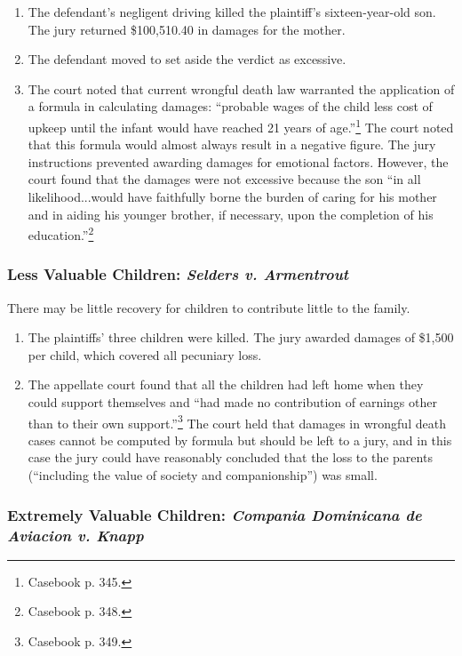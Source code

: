 \begin{enumerate}
    \item The defendant's negligent driving killed the plaintiff's 
    sixteen-year-old son. The jury returned \$100,510.40 in damages for the 
    mother.
    \item The defendant moved to set aside the verdict as excessive.
    \item The court noted that current wrongful death law warranted the 
    application of a formula in calculating damages: ``probable wages of the 
    child less cost of upkeep until the infant would have reached 21 years of 
    age.''\footnote{Casebook p. 345.} The court noted that this formula would 
    almost always result in a negative figure. The jury instructions prevented 
    awarding damages for emotional factors. However, the court found that the 
    damages were not excessive because the son ``in all likelihood...would 
    have faithfully borne the burden of caring for his mother and in aiding 
    his younger brother, if necessary, upon the completion of his 
    education.''\footnote{Casebook p. 348.}
\end{enumerate}

\subsubsection{Less Valuable Children: \emph{Selders v. Armentrout}}

There may be little recovery for children to contribute little to the family.

\begin{enumerate}
    \item The plaintiffs' three children were killed. The jury awarded damages 
    of \$1,500 per child, which covered all pecuniary loss.
    \item The appellate court found that all the children had left home when 
    they could support themselves and ``had made no contribution of earnings 
    other than to their own support.''\footnote{Casebook p. 349.} The court 
    held that damages in wrongful death cases cannot be computed by formula 
    but should be left to a jury, and in this case the jury could have 
    reasonably concluded that the loss to the parents (``including the value 
    of society and companionship'') was small.
\end{enumerate}

\subsubsection{Extremely Valuable Children: \emph{Compania Dominicana de 
Aviacion v. Knapp}}

